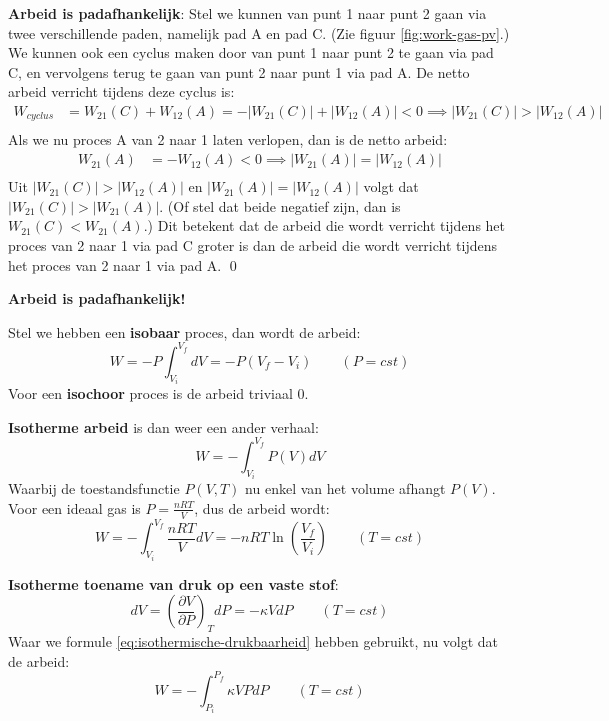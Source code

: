 \begin{derivation}
    \textbf{Arbeid is padafhankelijk}: Stel we kunnen van punt 1 naar punt 2 gaan via twee verschillende paden, namelijk pad A en pad C. (Zie figuur \ref{fig:work-gas-pv}.)
    We kunnen ook een cyclus maken door van punt 1 naar punt 2 te gaan via pad C, en vervolgens terug te gaan van punt 2 naar punt 1 via pad A. De netto arbeid verricht tijdens deze cyclus is:
    \begin{align*}
        W_{cyclus} &= W_{21}(C) + W_{12}(A) 
        = -|W_{21}(C)| + |W_{12}(A)| < 0 
        \implies |W_{21}(C)| > |W_{12}(A)| \\
    \end{align*}
    Als we nu proces A van 2 naar 1 laten verlopen, dan is de netto arbeid:
    \begin{align*}
        W_{21}(A) &= -W_{12}(A) <0 \implies |W_{21}(A)| = |W_{12}(A)| \\ 
    \end{align*}
    Uit \(|W_{21}(C)| > |W_{12}(A)|\) en \(|W_{21}(A)| = |W_{12}(A)|\) volgt dat \(|W_{21}(C)| > |W_{21}(A)|\). (Of stel dat beide negatief zijn, dan is \(W_{21}(C) < W_{21}(A)\).)
    Dit betekent dat de arbeid die wordt verricht tijdens het proces van 2 naar 1 via pad C groter is dan de arbeid die wordt verricht tijdens het proces van 2 naar 1 via pad A.
    \qed
\end{derivation}
\medskip
\begin{postulate}
    \textbf{Arbeid is padafhankelijk!}
\end{postulate}

Stel we hebben een  \textbf{isobaar} proces, dan wordt de arbeid:
\begin{equation}
\label{eq:isobare-arbeid}
W = -P \int_{V_i}^{V_f} dV = -P(V_f - V_i) \qquad (P = cst)
\end{equation}
Voor een  \textbf{isochoor} proces is de arbeid triviaal 0.

\textbf{Isotherme arbeid} is dan weer een ander verhaal:
\[
W = - \int_{V_i}^{V_f} P(V)dV
\]
Waarbij de toestandsfunctie \(P(V, T)\) nu enkel van het volume afhangt \(P(V)\). 
Voor een ideaal gas is \(P = \frac{nRT}{V}\), dus de arbeid wordt:
\begin{equation}
\label{eq: isotherme-arbeid-ideaal-gas}
W = - \int_{V_i}^{V_f} \frac{nRT}{V}dV = -nRT \ln\left( \frac{V_f}{V_i} \right) \qquad (T = cst)
\end{equation} 

\textbf{Isotherme toename van druk op een vaste stof}:
\[
dV = \left( \frac{\partial V}{\partial P} \right)_T dP = - \kappa V dP \qquad (T = cst)
\]
Waar we formule \eqref{eq:isothermische-drukbaarheid} hebben gebruikt, nu volgt dat de arbeid:
\begin{equation}
\label{eq: isotherme-arbeid-vast-stof}
W = - \int_{P_i}^{P_f} \kappa VP  dP \qquad (T = cst)
\end{equation} 

